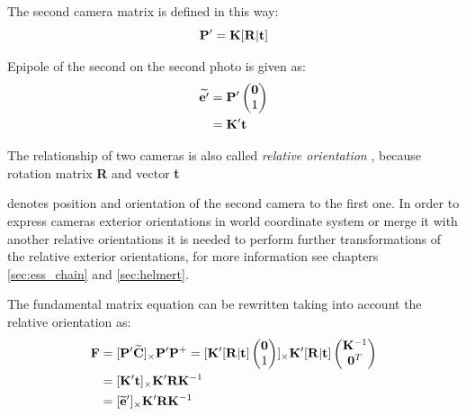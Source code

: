 \documentclass[a4paper,12pt]{article}
\newcommand{\ematr}[1]{
{\bf #1}
}
\newcommand{\evect}[1]{
{\bf #1}
}
\newcommand{\ehvect}[1]{
{\bf \widetilde{#1}}
}
\newcommand{\term}[1]{
{\it #1}%
}
\begin{document}
The second camera matrix is defined in this way:
\begin{equation}
\label{eq:rel_or_cam2}
\ematr{P}'  = \ematr{K} \ematr{[}\ematr{R}|\evect{t}\ematr{]}
\end{equation}


Epipole of the second on the second photo is given as:
\begin{equation}
\begin{split}
\label{eg:second_epipole}
\ehvect{e'} &=  \ematr{P'}
\begin{pmatrix}
   \evect{0} \\
    1 \\
\end{pmatrix} \\
&= \ematr{K}' \evect{t}\\
\end{split}
\end{equation}

The relationship of two cameras is also called \term{relative orientation}, because rotation matrix \ematr{R} and vector \evect{t}
denotes position and orientation of the second camera to the first one. In order to express cameras exterior orientations in world coordinate 
system or merge it with another relative orientations it is needed to perform further transformations of the relative 
exterior orientations, for more information see chapters \ref{sec:ess_chain} and \ref{sec:helmert}.

The fundamental matrix equation can be rewritten taking into account the relative orientation as:
\begin{equation}
\label{eg:funeq}
\begin{split}
\ematr{F}  &= [\ematr{P}'\ehvect{C}]_{\times} \ematr{P}'\ematr{P}^{+}
= [\ematr{K}' [\ematr{R}|\evect{t}]
\begin{pmatrix}
   \evect{0} \\
    1 \\
\end{pmatrix}]
_{\times} 
\ematr{K}' [\ematr{R}|\evect{t}]  
\begin{pmatrix}
   \evect{K}^{-1} \\
   \evect{0}^{T} \\
\end{pmatrix} \\
&= [\ematr{K}' \evect{t}]_{\times} \ematr{K}'\ematr{R}\ematr{K}^{-1} \\
&= [\ehvect{e}']_{\times} \ematr{K}'\ematr{R}\ematr{K}^{-1} 
\end{split}
\end{equation}
\end{document}
